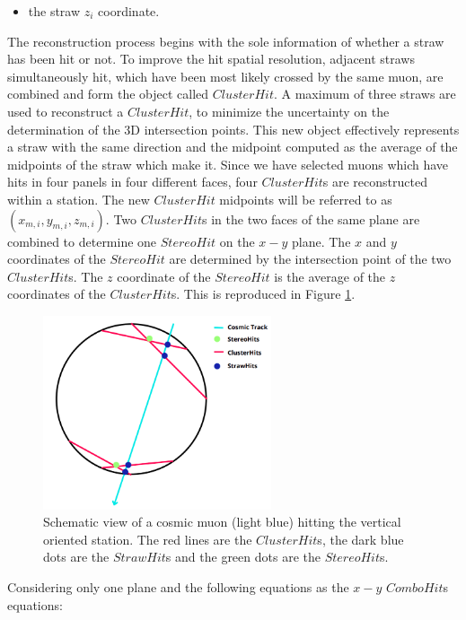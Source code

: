 {\begin{itemize}
    \item the straw $z_i$ coordinate.
\end{itemize} 
The reconstruction process begins 
with the sole information of whether 
a straw has been hit or not.
To improve the hit spatial resolution, adjacent 
straws simultaneously hit, which have been most 
likely crossed by the same muon, are combined 
and form the object called $ClusterHit$. 
A maximum of three straws are used to reconstruct a 
$ClusterHit$, to minimize the uncertainty on 
the determination of the 3D intersection points.
This new object effectively represents a 
straw with the same direction and the midpoint 
computed as the average of the midpoints of the straw 
which make it. Since we have selected muons which 
have hits in four panels in four different 
faces, four $ClusterHit$s are reconstructed 
within a station. The new $ClusterHit$ 
midpoints will be referred to as 
$(x_{m,i}, y_{m,i}, z_{m,i})$.
Two $ClusterHit$s in the two faces of the same 
plane are combined to determine one $StereoHit$ on 
the $x-y$ plane. 
The $x$ and $y$ coordinates of the 
$StereoHit$ are determined by the 
intersection point of the two 
$ClusterHit$s. The $z$ coordinate of 
the $StereoHit$ is the average of the 
$z$ coordinates of the $ClusterHit$s.
This is reproduced in Figure \ref{fig:stco}.
\begin{figure}[!h]
    \centering
    \includegraphics[width =0.6\textwidth]{figures/png/Screenshot_20240810_210144.png}
    \caption[Schematic view of a cosmic muon hitting the vertical oriented station.]{Schematic view of a cosmic muon (light blue) hitting the vertical oriented station. The red lines are the $ClusterHit$s, the dark blue dots 
    are the $StrawHit$s and the green dots are the $StereoHit$s.}
    \label{fig:stco}
\end{figure}
Considering only one plane and the following 
equations as the $x-y$ $ComboHit$s equations:
}

